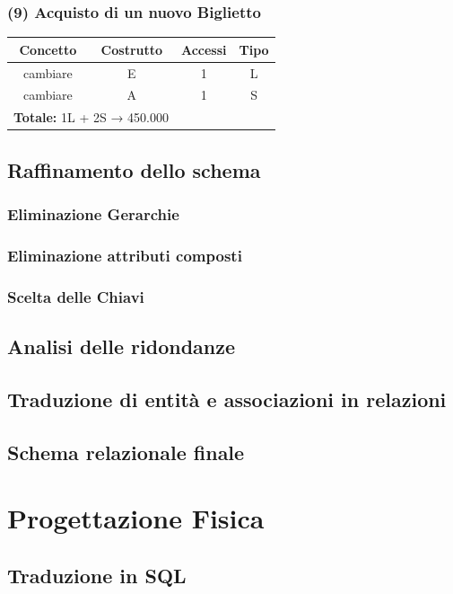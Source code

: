\documentclass[a4paper,12pt]{report}
\begin{document}
\subsection*{(9) Acquisto di un nuovo Biglietto}
\begin{center}
	\begin{tabular}{|c|c|c|c|}
		\hline\rowcolor{pink}
		Concetto & Costrutto & Accessi & Tipo\\
		\hline\hline		
		cambiare & E & 1 & L\\
		cambiare & A & 1 & S\\
		\hline
		\hline
		\multicolumn{2}{l}{%
			\textbf{Totale:} 1L + 2S → 450.000} \\
		\hline
	\end{tabular}
\end{center}
\section{Raffinamento dello schema}
\subsection{Eliminazione Gerarchie}
\subsection{Eliminazione attributi composti}
\subsection{Scelta delle Chiavi}
\section{Analisi delle ridondanze}
\section{Traduzione di entità e associazioni in relazioni}
\section{Schema relazionale finale}


\chapter{Progettazione Fisica}
\section{Traduzione in SQL}
\end{document}
